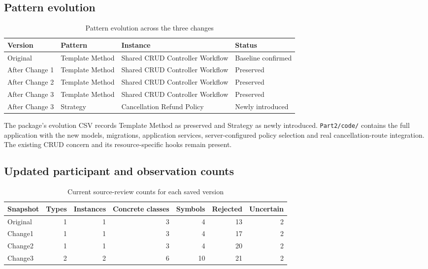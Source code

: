 \documentclass[10pt,a4paper]{article}
\newcommand{\code}[1]{\texttt{\small #1}}
\begin{document}
\subsection{Pattern evolution}

\begin{table}[H]
\centering
\caption{Pattern evolution across the three changes}
\label{tab:evolution}
\begin{tabularx}{\linewidth}{l l X l}
\toprule
Version & Pattern & Instance & Status\\
\midrule
Original & Template Method & Shared CRUD Controller Workflow & Baseline confirmed\\
After Change 1 & Template Method & Shared CRUD Controller Workflow & Preserved\\
After Change 2 & Template Method & Shared CRUD Controller Workflow & Preserved\\
After Change 3 & Template Method & Shared CRUD Controller Workflow & Preserved\\
After Change 3 & Strategy & Cancellation Refund Policy & Newly introduced\\
\bottomrule
\end{tabularx}
\end{table}

The package's evolution CSV records Template Method as preserved and Strategy as newly introduced. \code{Part2/code/} contains the full application with the new models, migrations, application services, server-configured policy selection and real cancellation-route integration. The existing CRUD concern and its resource-specific hooks remain present.

\subsection{Updated participant and observation counts}

\begin{table}[H]
\centering
\caption{Current source-review counts for each saved version}
\begin{tabular}{lrrrrrr}
\toprule
Snapshot & Types & Instances & Concrete classes & Symbols & Rejected & Uncertain\\
\midrule
Original & 1 & 1 & 3 & 4 & 13 & 2\\
Change1 & 1 & 1 & 3 & 4 & 17 & 2\\
Change2 & 1 & 1 & 3 & 4 & 20 & 2\\
Change3 & 2 & 2 & 6 & 10 & 21 & 2\\
\bottomrule
\end{tabular}
\end{table}
\end{document}
